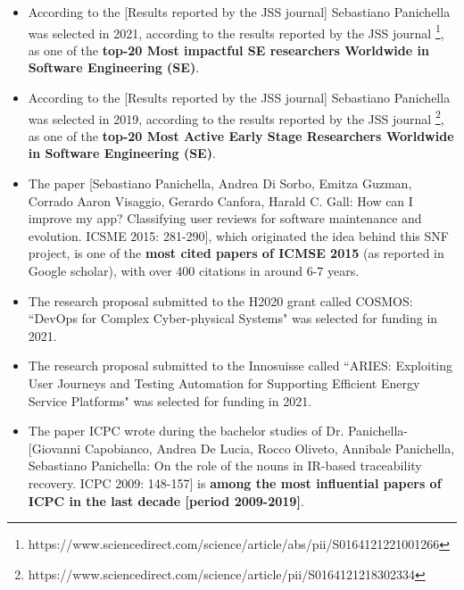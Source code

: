 \documentclass[10pt]{article}
\begin{document}
\vspace{-2.5mm}
\begin{itemize}
  \item According to the [Results reported by the JSS journal] Sebastiano Panichella was selected in 2021, according to the results reported by the JSS journal \footnote{https://www.sciencedirect.com/science/article/abs/pii/S0164121221001266}, as one of the \textbf{top-20 Most impactful SE researchers Worldwide in Software Engineering (SE)}. 
  \item According to the [Results reported by the JSS journal] Sebastiano Panichella was selected in 2019, according to the results reported by the JSS journal \footnote{https://www.sciencedirect.com/science/article/pii/S0164121218302334}, as one of the \textbf{top-20 Most Active Early Stage Researchers Worldwide in Software Engineering (SE)}. 
\vspace{-1.5mm}
  \item The paper [Sebastiano Panichella, Andrea Di Sorbo, Emitza Guzman, Corrado Aaron Visaggio, Gerardo Canfora, Harald C. Gall: How can I improve my app? Classifying user reviews for software maintenance and evolution. ICSME 2015: 281-290], which originated the idea behind this SNF project, is one of the \textbf{most cited papers of ICMSE 2015} (as reported in Google scholar), with over 400 citations in around 6-7 years.
  \item The research proposal submitted to the H2020 grant called COSMOS: ``DevOps for Complex Cyber-physical Systems" was selected for funding in 2021.
  \item The research proposal submitted to the Innosuisse called ``ARIES: Exploiting User Journeys and Testing Automation for Supporting Efficient Energy Service Platforms" was selected for funding in 2021.
\vspace{-1.5mm}
  \item The paper ICPC wrote during the bachelor studies of Dr. Panichella-[Giovanni Capobianco, Andrea De Lucia, Rocco Oliveto, Annibale Panichella, Sebastiano Panichella: On the role of the nouns in IR-based traceability recovery. ICPC 2009: 148-157] is \textbf{among the most influential papers of ICPC in the last decade [period 2009-2019]}.
  \vspace{-1.5mm}
\end{itemize}
\end{document}
